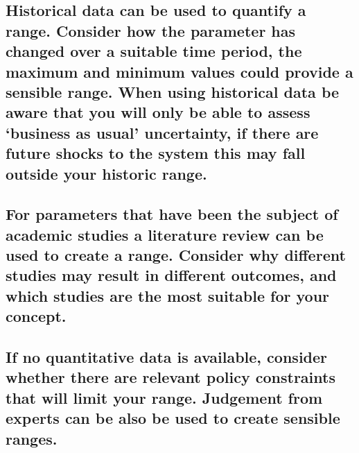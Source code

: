 \documentclass[]{book}
\begin{document}
\subsection{\texorpdfstring{Historical data can be used to quantify a
range. Consider how the parameter has changed over a suitable time
period, the maximum and minimum values could provide a sensible range.
When using historical data be aware that you will only be able to assess
`business as usual' uncertainty, if there are future shocks to the
system this may fall outside your historic
range.}{Historical data can be used to quantify a range. Consider how the parameter has changed over a suitable time period, the maximum and minimum values could provide a sensible range. When using historical data be aware that you will only be able to assess business as usual uncertainty, if there are future shocks to the system this may fall outside your historic range.}}\label{historical-data-can-be-used-to-quantify-a-range.-consider-how-the-parameter-has-changed-over-a-suitable-time-period-the-maximum-and-minimum-values-could-provide-a-sensible-range.-when-using-historical-data-be-aware-that-you-will-only-be-able-to-assess-business-as-usual-uncertainty-if-there-are-future-shocks-to-the-system-this-may-fall-outside-your-historic-range.}

\subsection{For parameters that have been the subject of academic
studies a literature review can be used to create a range. Consider why
different studies may result in different outcomes, and which studies
are the most suitable for your
concept.}\label{for-parameters-that-have-been-the-subject-of-academic-studies-a-literature-review-can-be-used-to-create-a-range.-consider-why-different-studies-may-result-in-different-outcomes-and-which-studies-are-the-most-suitable-for-your-concept.}

\subsection{If no quantitative data is available, consider whether there
are relevant policy constraints that will limit your range. Judgement
from experts can be also be used to create sensible
ranges.}\label{if-no-quantitative-data-is-available-consider-whether-there-are-relevant-policy-constraints-that-will-limit-your-range.-judgement-from-experts-can-be-also-be-used-to-create-sensible-ranges.}
\end{document}
